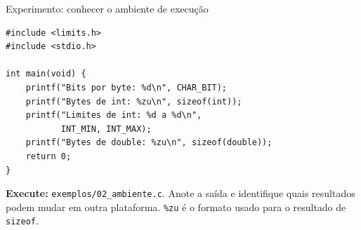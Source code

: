 \begin{frame}[fragile]{Experimento: conhecer o ambiente de execução}
\begin{lstlisting}
#include <limits.h>
#include <stdio.h>

int main(void) {
    printf("Bits por byte: %d\n", CHAR_BIT);
    printf("Bytes de int: %zu\n", sizeof(int));
    printf("Limites de int: %d a %d\n",
           INT_MIN, INT_MAX);
    printf("Bytes de double: %zu\n", sizeof(double));
    return 0;
}
\end{lstlisting}
\small
\textbf{Execute:} \texttt{exemplos/02\_ambiente.c}. Anote a saída e identifique quais resultados podem mudar em outra plataforma. \texttt{\%zu} é o formato usado para o resultado de \texttt{sizeof}.
\end{frame}

